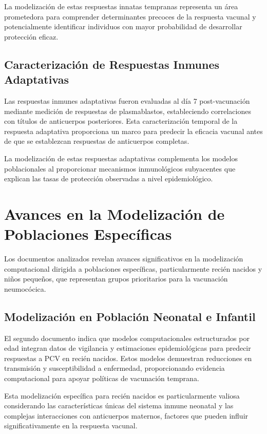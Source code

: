 La modelización de estas respuestas innatas tempranas representa un área prometedora para comprender determinantes precoces de la respuesta vacunal y potencialmente identificar individuos con mayor probabilidad de desarrollar protección eficaz.

\subsection{Caracterización de Respuestas Inmunes Adaptativas}

Las respuestas inmunes adaptativas fueron evaluadas al día 7 post-vacunación mediante medición de respuestas de plasmablastos, estableciendo correlaciones con títulos de anticuerpos posteriores. Esta caracterización temporal de la respuesta adaptativa proporciona un marco para predecir la eficacia vacunal antes de que se establezcan respuestas de anticuerpos completas.

La modelización de estas respuestas adaptativas complementa los modelos poblacionales al proporcionar mecanismos inmunológicos subyacentes que explican las tasas de protección observadas a nivel epidemiológico.

\section{Avances en la Modelización de Poblaciones Específicas}

Los documentos analizados revelan avances significativos en la modelización computacional dirigida a poblaciones específicas, particularmente recién nacidos y niños pequeños, que representan grupos prioritarios para la vacunación neumocócica.

\subsection{Modelización en Población Neonatal e Infantil}

El segundo documento indica que modelos computacionales estructurados por edad integran datos de vigilancia y estimaciones epidemiológicas para predecir respuestas a PCV en recién nacidos. Estos modelos demuestran reducciones en transmisión y susceptibilidad a enfermedad, proporcionando evidencia computacional para apoyar políticas de vacunación temprana.

Esta modelización específica para recién nacidos es particularmente valiosa considerando las características únicas del sistema inmune neonatal y las complejas interacciones con anticuerpos maternos, factores que pueden influir significativamente en la respuesta vacunal.

